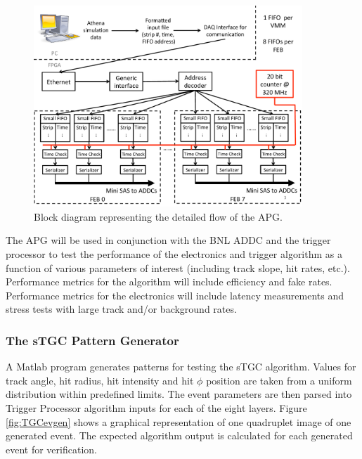 \begin{figure}[h]
 \begin{center}
 \includegraphics[width=0.9\textwidth]{figures/APGBlockDiagramFinal}
 \caption{Block diagram representing the detailed flow of the APG.}
 \label{fig:APGBlockDiag}
 \end{center}
 \end{figure}

The APG will be used in conjunction with the BNL ADDC and the trigger
processor to test the performance of the electronics and trigger
algorithm  as a function of various parameters of interest (including
track slope,  hit rates, etc.). Performance metrics for the algorithm
will include efficiency and fake rates. Performance metrics for the
electronics  will include latency measurements and stress tests with
large track and/or background rates.
\FloatBarrier

\subsubsection{The sTGC Pattern Generator}
\label{sec:sTGCpattern}

A Matlab program generates patterns for testing the sTGC algorithm.
Values for track angle, hit radius, hit intensity and hit $\phi$ position are taken from a uniform distribution within predefined limits.
The event parameters are then parsed into Trigger Processor algorithm inputs for each of the eight layers.
Figure\,\ref{fig:TGCevgen} shows a graphical representation of one quadruplet image of one generated event.
The expected algorithm output is calculated for each generated event for verification.


